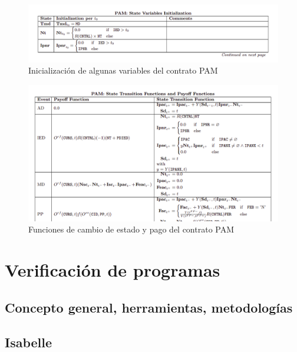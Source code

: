 \documentclass[12pt]{book}
\begin{document}
\begin{figure}
    \centering
    \includegraphics[width=\textwidth]{PAM_State_Variables_Initialization.png}
    \caption{Inicialización de algunas variables del contrato PAM}\label{fig:PAM_State_Variables_Initialization}
\end{figure}

\begin{figure}
    \centering
    \includegraphics[width=\textwidth]{PAM_STF_POF.png}
    \caption{Funciones de cambio de estado y pago del contrato PAM}\label{fig:PAM_STF_POF}
\end{figure}



\chapter{Verificación de programas}
\section{Concepto general, herramientas, metodologías}
\section{Isabelle}

\end{document}
